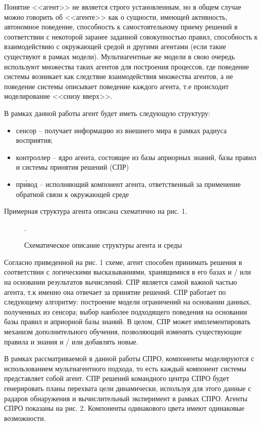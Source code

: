 Понятие <<агент>> не является строго установленным, но в общем случае можно говорить об <<агенте>> как о сущности, имеющей активность, автономное поведение, способность к самостоятельному приему решений в соответствии  с некоторой заранее заданной совокупностью правил, способность к взаимодействию  с окружающей средой и другими агентами (если такие существуют в рамках модели). Мультиагентные же модели в свою очередь используют множества таких агентов для построения процессов, где поведение системы возникает как следствие взаимодействия множества агентов, а не поведение системы описывает поведение каждого агента, т.е происходит моделирование <<снизу вверх>>.

В рамках данной работы агент будет иметь следующую структуру:
\begin{itemize}
	
	\item сенсор -- получает информацию из внешнего мира в рамках радиуса восприятия;
	\item контроллер -- ядро агента, состоящее из базы априорных знаний, базы правил и системы  принятия решений (СПР)
	\item пр\'{и}вод -- исполняющий компонент агента, ответственный за применение обратной связи к окружающей среде  

\end{itemize}

Примерная структура агента описана схематично на рис. 1.

\begin{figure*}[h!]
	\caption{Схематическое описание структуры агента и среды}.
\end{figure*} 

Согласно приведенной на рис. 1 схеме, агент способен принимать решения в соответствии с логическими  высказываниями, хранящимися в его базах и / или на основании результатов вычислений. СПР является самой важной частью агента, т.к именно она отвечает за принятие решений. СПР работает по следующему алгоритму: построение модели ограничений на основании данных, полученных из сенсора; выбор наиболее подходящего поведения на основании базы правил и априорной базы знаний.  В целом, СПР может имплементировать механизм дополнительного обучения, позволяющий изменять существующие правила и знания и / или добавлять новые.  

В рамках рассматриваемой в данной работы СПРО, компоненты моделируются с использованием мультиагентного подхода, то есть каждый компонент системы представляет собой агент. СПР решений командного центра СПРО будет генерировать планы перехвата цели динамически, используя для этого данные с радаров обнаружения и вычислительный эксперимент в рамках СПРО. Агенты СПРО показаны на рис. 2. Компоненты одинакового цвета имеют одинаковые возможности. 

